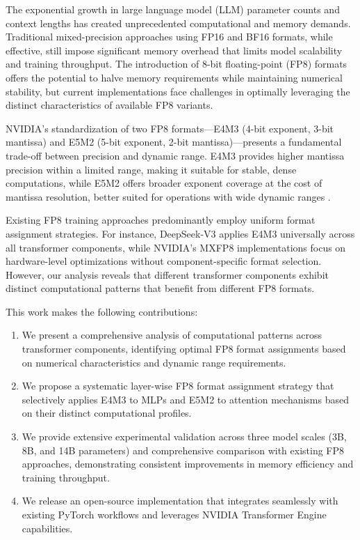 \documentclass[conference]{IEEEtran}
\begin{document}
The exponential growth in large language model (LLM) parameter counts and context lengths has created unprecedented computational and memory demands. Traditional mixed-precision approaches using FP16 and BF16 formats, while effective, still impose significant memory overhead that limits model scalability and training throughput. The introduction of 8-bit floating-point (FP8) formats \cite{micikevicius2022fp8formatsdeeplearning} offers the potential to halve memory requirements while maintaining numerical stability, but current implementations face challenges in optimally leveraging the distinct characteristics of available FP8 variants.

NVIDIA's standardization of two FP8 formats—E4M3 (4-bit exponent, 3-bit mantissa) and E5M2 (5-bit exponent, 2-bit mantissa)—presents a fundamental trade-off between precision and dynamic range. E4M3 provides higher mantissa precision within a limited range, making it suitable for stable, dense computations, while E5M2 offers broader exponent coverage at the cost of mantissa resolution, better suited for operations with wide dynamic ranges \cite{nvidia2022fp8}.

Existing FP8 training approaches predominantly employ uniform format assignment strategies. For instance, DeepSeek-V3 \cite{deepseekv3} applies E4M3 universally across all transformer components, while NVIDIA's MXFP8 implementations \cite{nvidia2024mxfp8} focus on hardware-level optimizations without component-specific format selection. However, our analysis reveals that different transformer components exhibit distinct computational patterns that benefit from different FP8 formats.

This work makes the following contributions:

\begin{enumerate}
\item We present a comprehensive analysis of computational patterns across transformer components, identifying optimal FP8 format assignments based on numerical characteristics and dynamic range requirements.

\item We propose a systematic layer-wise FP8 format assignment strategy that selectively applies E4M3 to MLPs and E5M2 to attention mechanisms based on their distinct computational profiles.

\item We provide extensive experimental validation across three model scales (3B, 8B, and 14B parameters) and comprehensive comparison with existing FP8 approaches, demonstrating consistent improvements in memory efficiency and training throughput.

\item We release an open-source implementation that integrates seamlessly with existing PyTorch workflows and leverages NVIDIA Transformer Engine capabilities.
\end{enumerate}
\end{document}

